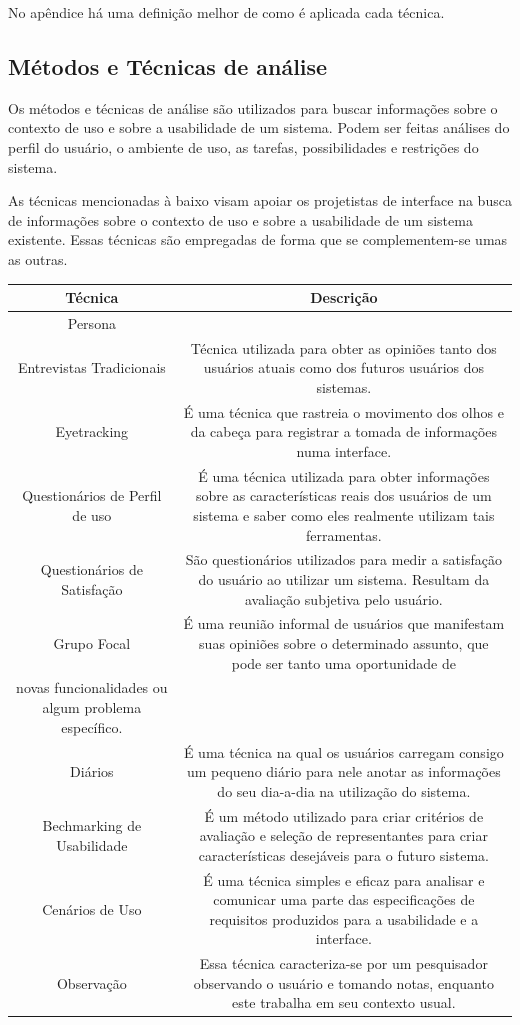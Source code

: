 No apêndice há uma definição melhor de como é aplicada cada técnica.

\subsection{Métodos e Técnicas de análise}

Os métodos e técnicas de análise são utilizados para buscar informações sobre o contexto de uso e sobre a usabilidade de um sistema. Podem ser feitas análises do perfil do usuário, o ambiente de uso, as tarefas, possibilidades e restrições do sistema.

As técnicas mencionadas à baixo visam apoiar os projetistas de interface na busca de informações sobre o contexto de uso e sobre a usabilidade de um sistema existente. Essas técnicas são empregadas de forma que se complementem-se umas as outras.

\begin{tabular}{|c|c|}
\hline 
Técnica & Descrição \\ 
\hline 
Persona &  \\ 
\hline 
Entrevistas Tradicionais & Técnica utilizada para obter as opiniões tanto dos usuários atuais como dos futuros usuários dos sistemas. \\ 
\hline 
Eyetracking & É uma técnica que rastreia o movimento dos olhos e da cabeça para registrar a tomada de informações numa interface. \\ 
\hline 
Questionários de Perfil de uso & É uma técnica utilizada para obter informações sobre as características reais dos usuários de um sistema e saber como eles realmente utilizam tais ferramentas. \\ 
\hline 
Questionários de Satisfação & São questionários utilizados para medir a satisfação do usuário ao utilizar um sistema. Resultam da avaliação subjetiva pelo usuário. \\ 
\hline 
Grupo Focal & É uma reunião informal de usuários que manifestam suas opiniões sobre o determinado assunto, que pode ser tanto uma oportunidade de\\ novas funcionalidades ou algum problema específico. \\ 
\hline 
Diários & É uma técnica na qual os usuários carregam consigo um pequeno diário para nele anotar as informações do seu dia-a-dia na utilização do sistema.\\ 
\hline 
Bechmarking de Usabilidade & É um método utilizado para criar critérios de avaliação e seleção de representantes para criar características desejáveis para o futuro sistema. \\ 
\hline 
Cenários de Uso & É uma técnica simples e eficaz para analisar e comunicar uma parte das especificações de requisitos produzidos para a usabilidade e a interface. \\ 
\hline 
Observação & Essa técnica caracteriza-se por um pesquisador observando o usuário e tomando notas, enquanto este trabalha em seu contexto usual. \\ 
\hline  
\end{tabular} 


